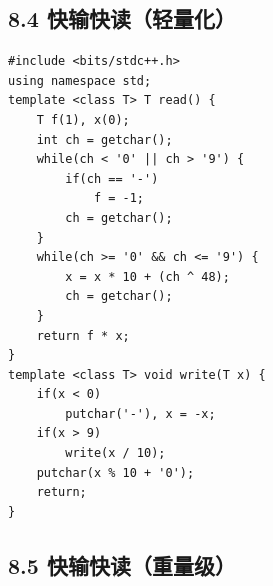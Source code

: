 \documentclass[UTF8,a4paper,11pt]{ctexart}
\begin{document}
\subsection*{8.4 快输快读（轻量化）}

\begin{Verbatim}[fontsize=\small,frame=single,breaklines=true,breakanywhere=true]
#include <bits/stdc++.h>
using namespace std;
template <class T> T read() {
    T f(1), x(0);
    int ch = getchar();
    while(ch < '0' || ch > '9') {
        if(ch == '-')
            f = -1;
        ch = getchar();
    }
    while(ch >= '0' && ch <= '9') {
        x = x * 10 + (ch ^ 48);
        ch = getchar();
    }
    return f * x;
}
template <class T> void write(T x) {
    if(x < 0)
        putchar('-'), x = -x;
    if(x > 9)
        write(x / 10);
    putchar(x % 10 + '0');
    return;
}
\end{Verbatim}

\subsection*{8.5 快输快读（重量级）}
\end{document}

